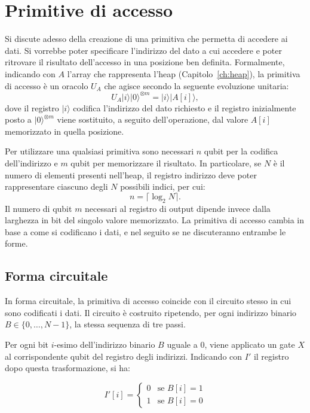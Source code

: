\section{Primitive di accesso \label{sec:primitive-accesso}}
Si discute adesso della creazione di una primitiva che permetta di accedere ai dati. Si vorrebbe poter specificare l'indirizzo del dato a cui accedere e poter ritrovare il risultato dell'accesso in una posizione ben definita. Formalmente, indicando con $A$ l'array che rappresenta l'heap (Capitolo~\ref{ch:heap}), la primitiva di accesso è un oracolo $U_A$ che agisce secondo la seguente evoluzione unitaria:
\begin{equation}
  U_A|i\rangle|0\rangle^{\otimes m} = |i\rangle|A[i]\rangle,
\end{equation}
dove il registro $|i\rangle$ codifica l'indirizzo del dato richiesto e il registro inizialmente posto a $|0\rangle^{\otimes m}$ viene sostituito, a seguito dell'operazione, dal valore $A[i]$ memorizzato in quella posizione.

Per utilizzare una qualsiasi primitiva sono necessari $n$ qubit per la codifica dell'indirizzo e $m$ qubit per memorizzare il risultato. In particolare, se $N$ è il numero di elementi presenti nell'heap, il registro indirizzo deve poter rappresentare ciascuno degli $N$ possibili indici, per cui:
\begin{equation}
  n = \lceil \log_2 N \rceil.
\end{equation}
Il numero di qubit $m$ necessari al registro di output dipende invece dalla larghezza in bit del singolo valore memorizzato. La primitiva di accesso cambia in base a come si codificano i dati, e nel seguito se ne discuteranno entrambe le forme.
\subsection{Forma circuitale}
In forma circuitale, la primitiva di accesso coincide con il circuito stesso in cui sono codificati i dati. Il circuito è costruito ripetendo, per ogni indirizzo binario $B \in \{0, \dots, N-1\}$, la stessa sequenza di tre passi.

Per ogni bit $i$-esimo dell'indirizzo binario $B$ uguale a $0$, viene applicato un gate $X$ al corrispondente qubit del registro degli indirizzi. Indicando con $I'$ il registro dopo questa trasformazione, si ha:

\begin{equation}
  I'[i] =
  \begin{cases}
    0 & \text{se } B[i]=1 \\
    1 & \text{se } B[i]=0
  \end{cases}
\end{equation}


